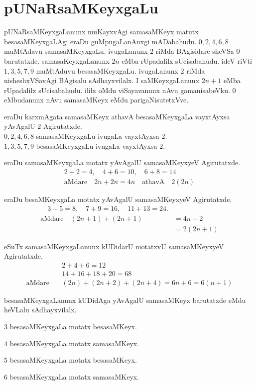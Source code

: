\chapter{pUNaRsaMKeyxgaLu}

pUNaRsaMKeyxgaLanunx muKayxvAgi samasaMKeyx matutx besasaMKeyxgaLAgi eraDu guMpu\-gaLanAnxgi mADabahudu. $0,2,4,6,8$ muMtAdavu samasaMKeyxgaLu. ivugaLanunx $2$ riMda BAgisidare sheVSa $0$ barutatxde. samasaKeyxgaLanunx $2n$ eMba rUpadalilx sUci\-sabahudu. ideV riVti $1,3,5,7,9$ muMtAduvu besasaMKeyxgaLu. ivugaLanunx $2$ riMda nisheshxVSavAgi BAgisalu sAdhayxvilalx. I saMKeyxgaLanunx $2n+1$ eMba rUpadalilx sUcisabahudu. ililx oMdu viSayavanunx nAvu gamanisabeVku. $0$ eMbudanunx nAvu samasaMKeyx eMdu parigaNisutetxVve.

eraDu karxmAgata samasaMKeyx athavA besasaMKeyxgaLa vayxtAyxsa yAvAgalU $2$ \-Agirutatxde.\\
$0,2,4,6,8$ samasaMKeyxgaLu ivugaLa vayxtAyxsa $2$.\\ 
$1,3,5,7,9$ besasaMKeyxgaLu ivugaLa vayxtAyxsa $2$. 

eraDu samasaMKeyxgaLa motatx yAvAgalU samasaMKeyxyeV Agirutatxde.
\begin{align*}
2+2 =4, \quad 4+6=10, \quad 6+8=14\\
\text{aMdare}\quad 2n+2n =4n\quad \text{athavA}\quad 2(2n)
\end{align*}

eraDu besaMKeyxgaLa motatx yAvAgalU samasaMKeyxyeV Agirutatxde.
\begin{align*}
\quad 3+5=8,\quad 7+9=16,\quad  11+13=24.\\
\text{aMdare}\quad (2n+1)+(2n+1) &= 4n+2\\
 &= 2(2n+1)
\end{align*}

eSuTx samasaMKeyxgaLanunx kUDidarU motatxvU samasaMKeyxyeV Agirutatxde.
\begin{align*}
&2+4+6=12\\
&14+16+18+20=68\\
\text{aMdare}\quad &(2n)+(2n+2)+(2n+4)=6n+6=6(n+1)
\end{align*}

besasaMKeyxgaLanunx kUDidAga yAvAgalU samasaMKeyx barutatxde eMdu heVLalu sAdhayxvilalx.
\begin{description}
\item $3$ besasaMKeyxgaLa motatx besasaMKeyx.
\item $4$ besasaMKeyxgaLa motatx samasaMKeyx.
\item $5$ besasaMKeyxgaLa motatx besasaMKeyx.
\item $6$ besasaMKeyxgaLa motatx samasaMKeyx.
\end{description}

